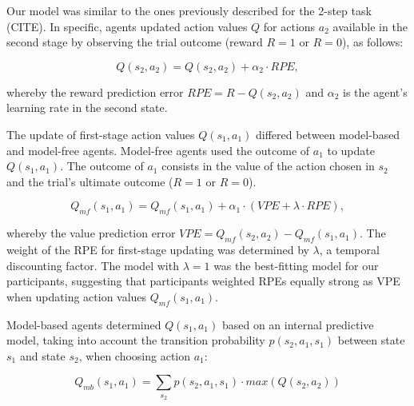 \documentclass[11pt]{article} %
\begin{document}
Our model was similar to the ones previously described for the 2-step task (CITE). In specific, agents updated action values $Q$ for actions $a_{2}$ available in the second stage by observing the trial outcome (reward $R = 1$ or $R = 0$), as follows:

\begin{equation}
Q(s_{2}, a_{2}) = Q(s_{2}, a_{2}) + \alpha_{2} \cdot RPE,
\end{equation}

whereby the reward prediction error $RPE = R - Q(s_{2}, a_{2})$ and $\alpha_{2}$ is the agent's learning rate in the second state.

The update of first-stage action values $Q(s_{1}, a_{1})$ differed between model-based and model-free agents. Model-free agents used the outcome of $a_{1}$ to update $Q(s_{1}, a_{1})$. The outcome of $a_{1}$ consists in the value of the action chosen in $s_{2}$ and the trial's ultimate outcome ($R = 1$ or $R = 0$).

\begin{equation}
Q_{mf}(s_{1}, a_{1}) = Q_{mf}(s_{1}, a_{1}) + \alpha_{1} \cdot (VPE + \lambda \cdot RPE),
\end{equation}

whereby the value prediction error $VPE = Q_{mf}(s_{2}, a_{2}) - Q_{mf}(s_{1}, a_{1})$. The weight of the RPE for first-stage updating was determined by $ \lambda $, a temporal discounting factor. The model with $\lambda = 1$ was the best-fitting model for our participants, suggesting that participants weighted RPEs equally strong as VPE when updating action values $Q_{mf}(s_{1}, a_{1})$.

Model-based agents determined $Q(s_{1}, a_{1})$ based on an internal predictive model, taking into account the transition probability $p(s_{2}, a_{1}, s_{1})$ between state $s_{1}$ and state $s_{2}$, when choosing action $a_{1}$:

\begin{equation}
Q_{mb}(s_{1}, a_{1}) = \sum_{s_{2}} p(s_{2}, a_{1}, s_{1}) \cdot max(Q(s_{2}, a_{2}))
\end{equation}
\end{document}
